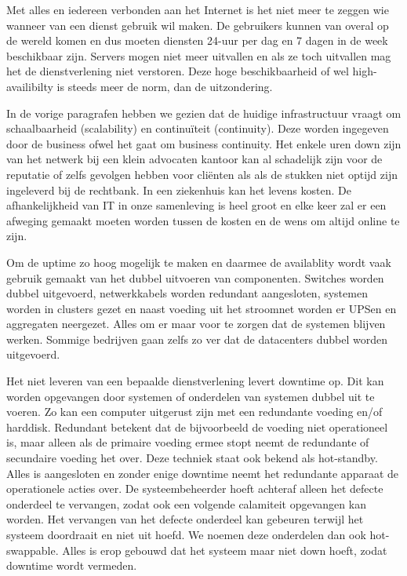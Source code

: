 Met alles en iedereen verbonden aan het Internet is het niet meer te zeggen wie wanneer van een dienst gebruik wil maken. De gebruikers kunnen van overal op de wereld komen en dus moeten diensten 24-uur per dag en 7 dagen in de week beschikbaar zijn. Servers mogen niet meer uitvallen en als ze toch uitvallen mag het de dienstverlening niet verstoren. Deze hoge beschikbaarheid of wel high-availibilty is steeds meer de norm, dan de uitzondering.

In de vorige paragrafen hebben we gezien dat de huidige infrastructuur vraagt om schaalbaarheid (scalability) en continu\"iteit (continuity). Deze worden ingegeven door de business ofwel het gaat om business continuity. Het enkele uren down zijn van het netwerk bij een klein advocaten kantoor kan al schadelijk zijn voor de reputatie of zelfs gevolgen hebben voor cli\"enten als als de stukken niet optijd zijn ingeleverd bij de rechtbank. In een ziekenhuis kan het levens kosten. De afhankelijkheid van IT in onze samenleving is heel groot en elke keer zal er een afweging gemaakt moeten worden tussen de kosten en de wens om altijd online te zijn.

Om de uptime zo hoog mogelijk te maken en daarmee de availablity wordt vaak gebruik gemaakt van het dubbel uitvoeren van componenten. Switches worden dubbel uitgevoerd, netwerkkabels worden redundant aangesloten, systemen worden in clusters gezet en naast voeding uit het stroomnet worden er UPSen en aggregaten neergezet. Alles om er maar voor te zorgen dat de systemen blijven werken. Sommige bedrijven gaan zelfs zo ver dat de datacenters dubbel worden uitgevoerd.

Het niet leveren van een bepaalde dienstverlening levert downtime op. Dit kan worden opgevangen door systemen of onderdelen van systemen dubbel uit te voeren. Zo kan een computer uitgerust zijn met een redundante voeding en/of harddisk. Redundant betekent dat de bijvoorbeeld de voeding niet operationeel is, maar alleen als de primaire voeding ermee stopt neemt de redundante of secundaire voeding het over. Deze techniek staat ook bekend als hot-standby. Alles is aangesloten en zonder enige downtime neemt het redundante apparaat de operationele acties over. De systeembeheerder hoeft achteraf alleen het defecte onderdeel te vervangen, zodat ook een volgende calamiteit opgevangen kan worden. Het vervangen van het defecte onderdeel kan gebeuren terwijl het systeem doordraait en niet uit hoefd. We noemen deze onderdelen dan ook hot-swappable. Alles is erop gebouwd dat het systeem maar niet down hoeft, zodat downtime wordt vermeden.


